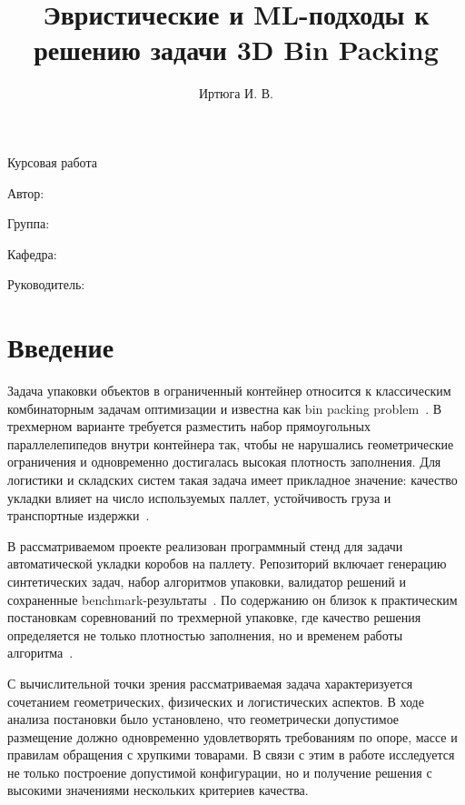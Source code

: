 \documentclass[14pt,a4paper]{extarticle}
\title{Эвристические и ML-подходы к решению задачи 3D Bin Packing}
\author{Иртюга И. В.}
\makeatletter
\newif\ifusekprj
\providecommand{\@chair}{}
\providecommand{\@group}{}
\providecommand{\@chief}{}
\providecommand{\@workyear}{\the\year}
\makeatother
\begin{document}
\ifusekprj
  \maketitle
\else
  \begin{titlepage}
    \makeatletter
    \centering
    {\large Курсовая работа\par}
    \vspace{1.5cm}
    {\bfseries\LARGE \@title \par}
    \vspace{1.5cm}
    {\large Автор: \@author\par}
    \vspace{0.5cm}
    {\large Группа: \@group\par}
    \vspace{0.5cm}
    {\large Кафедра: \@chair\par}
    \vspace{0.5cm}
    {\large Руководитель: \@chief\par}
    \vfill
    {\large \@workyear\par}
    \makeatother
  \end{titlepage}
\fi
\tableofcontents
\pagebreak

\section{Введение}

Задача упаковки объектов в ограниченный контейнер относится к классическим комбинаторным задачам оптимизации и известна как bin packing problem~\cite{wiki_bin_packing,martello2000}. В трехмерном варианте требуется разместить набор прямоугольных параллелепипедов внутри контейнера так, чтобы не нарушались геометрические ограничения и одновременно достигалась высокая плотность заполнения. Для логистики и складских систем такая задача имеет прикладное значение: качество укладки влияет на число используемых паллет, устойчивость груза и транспортные издержки~\cite{isa2016}.

В рассматриваемом проекте реализован программный стенд для задачи автоматической укладки коробов на паллету. Репозиторий включает генерацию синтетических задач, набор алгоритмов упаковки, валидатор решений и сохраненные benchmark-результаты~\cite{project_repo}. По содержанию он близок к практическим постановкам соревнований по трехмерной упаковке, где качество решения определяется не только плотностью заполнения, но и временем работы алгоритма~\cite{kaggle_sleigh}.

С вычислительной точки зрения рассматриваемая задача характеризуется сочетанием геометрических, физических и логистических аспектов. В ходе анализа постановки было установлено, что геометрически допустимое размещение должно одновременно удовлетворять требованиям по опоре, массе и правилам обращения с хрупкими товарами. В связи с этим в работе исследуется не только построение допустимой конфигурации, но и получение решения с высокими значениями нескольких критериев качества.
\end{document}

